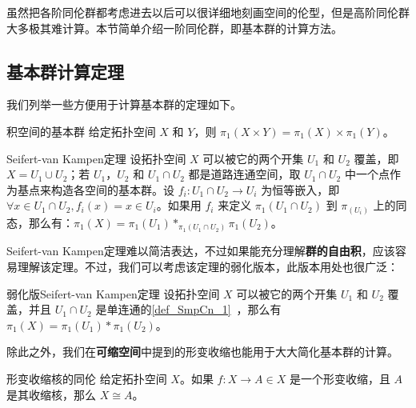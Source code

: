 

虽然把各阶同伦群都考虑进去以后可以很详细地刻画空间的伦型，但是高阶同伦群大多极其难计算。本节简单介绍一阶同伦群，即基本群的计算方法。

\subsection{基本群计算定理}

我们列举一些方便用于计算基本群的定理如下。

\begin{theorem}{积空间的基本群}
给定拓扑空间 $X$ 和 $Y$，则 $\pi_1(X\times Y)=\pi_1(X)\times\pi_1(Y)$。
\end{theorem}

\begin{theorem}{Seifert-van Kampen定理}
设拓扑空间 $X$ 可以被它的两个开集 $U_1$ 和 $U_2$ 覆盖，即 $X=U_1\cup U_2$；若 $U_1$，$U_2$ 和 $U_1\cap U_2$ 都是道路连通空间，取 $U_1\cap U_2$ 中一个点作为基点来构造各空间的基本群。设 $f_i:U_1\cap U_2\rightarrow U_i$ 为恒等嵌入，即 $\forall x\in U_1\cap U_2, f_i(x)=x\in U_i$。如果用 $f_i$ 来定义 $\pi_1(U_1\cap U_2)$ 到 $\pi_(U_i)$ 上的同态，那么有：$\pi_1(X)=\pi_1(U_1)*_{\pi_1(U_1\cap U_2)}\pi_1(U_2)$。
\end{theorem}

Seifert-van Kampen定理难以简洁表达，不过如果能充分理解\textbf{群的自由积}，应该容易理解该定理。不过，我们可以考虑该定理的弱化版本，此版本用处也很广泛：

\begin{theorem}{弱化版Seifert-van Kampen定理}
设拓扑空间 $X$ 可以被它的两个开集 $U_1$ 和 $U_2$ 覆盖，并且 $U_1\cap U_2$ 是单连通的\autoref{def_SmpCn_1}~，那么有 $\pi_1(X)=\pi_1(U_1)*\pi_1(U_2)$。
\end{theorem}

除此之外，我们在\textbf{可缩空间}中提到的形变收缩也能用于大大简化基本群的计算。

\begin{theorem}{形变收缩核的同伦}\label{the_HomT5_1}
给定拓扑空间 $X$。如果 $f:X\rightarrow A\in X$ 是一个形变收缩，且 $A$ 是其收缩核，那么 $X\cong A$。
\end{theorem}

